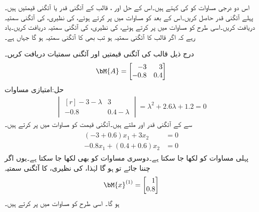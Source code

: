 اس دو درجی مساوات کو  کی  کہتے ہیں۔اس کے حل  اور ، قالب  کے آئگنی قدر یا آئگنی قیمتیں ہیں۔پہلے آئگنی قدر حاصل کریں۔اس کے بعد  کو مساوات  میں پر کرتے ہوئے،  کی نظیری،  کی آئگنی سمتیہ  دریافت کریں۔اسی طرح  کو مساوات  میں پر کرتے ہوئے،  کی نظیری،  کی آئگنی سمتیہ  دریافت کریں۔یاد رہے کہ اگر  قالب  کا آئگنی سمتیہ ہو تب  بھی  کا آئگنی سمتیہ ہو گا جہاں  ہے۔

درج ذیل قالب کی آئگنی قیمتیں اور آئگنی سمتیات دریافت کریں۔
\begin{align*}
\bM{A}=
\begin{bmatrix*}[r]
-3& 3\\
-0.8&0.4
\end{bmatrix*}
\end{align*}
حل:امتیازی مساوات
\begin{align*}
\begin{vmatrix*}[r]
-3-\lambda&3\\
-0.8&0.4-\lambda
\end{vmatrix*}=\lambda^2+2.6\lambda+1.2=0
\end{align*}
سے  کے آئگنی قدر  اور  ملتے ہیں۔آئگنی قیمت  کو مساوات  میں پر کرتے ہیں۔
\begin{gather*}
\begin{aligned}
(-3+0.6)x_1+3x_2&=0\\
-0.8x_1+(0.4+0.6)x_2&=0
\end{aligned}
\end{gather*}
پہلی مساوات کو  لکھا جا سکتا ہے۔دوسری مساوات کو بھی  لکھا جا سکتا ہے۔یوں اگر  چننا جائے تو   ہو گا لہٰذا،  کی نظیری،  کا آئگنی سمتیہ 
\begin{align*}
\bM{x}^{(1)}=
\begin{bmatrix*}[r]
1\\
0.8
\end{bmatrix*}
\end{align*}
ہو گا۔ اسی طرح  کو مساوات  میں پر کرتے ہیں۔

